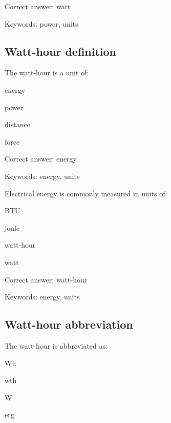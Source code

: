 Correct answer: watt

Keywords: power, units

\subsection{Watt-hour definition}

\begin{question}
	\item The watt-hour is a unit of:
\end{question}

\begin{answer}
	\item energy
	\item power
	\item distance
	\item force
\end{answer}

Correct answer: energy

Keywords: energy, units

\begin{question}
	\item Electrical energy is commonly measured in units of:
\end{question}

\begin{answer}
	\item BTU
	\item joule
	\item watt-hour
	\item watt
\end{answer}

Correct answer: watt-hour

Keywords: energy, units

\subsection{Watt-hour abbreviation}

\begin{question}
	\item The watt-hour is abbreviated as:
\end{question}

\begin{answer}
	\item Wh
	\item wth
	\item W
	\item erg
\end{answer}

